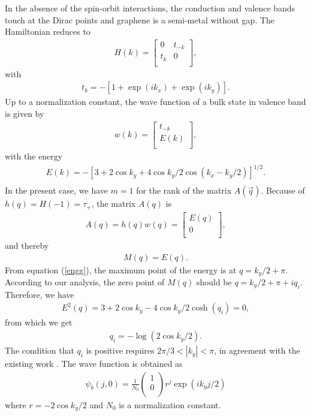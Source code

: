 \documentclass[aps,pra,amsmath,twocolumn,showpacs,bibnotes,10pt]{revtex4-1}
\begin{document}
In the absence of the spin-orbit interactions, the conduction and valence bands touch at the Dirac points and graphene is a semi-metal without gap. The Hamiltonian reduces to
\begin{eqnarray}
H(k) = \begin{bmatrix}
	0&t_{-k}\\
	t_k&0\\
\end{bmatrix}, \nonumber
\end{eqnarray}
with 
\begin{eqnarray}
t_k = -[1+\exp(ik_x)+\exp(ik_y)]. \nonumber
\end{eqnarray}
Up to a normalization constant, the wave function of a bulk state in valence band is given by
\begin{eqnarray}
w(k) = \begin{bmatrix}
	t_{-k}\\
	E(k)\\
\end{bmatrix}, \nonumber
\end{eqnarray}
with the energy 
\begin{eqnarray}
E(k) = -[3+2\cos k_y+4\cos k_y/2 \cos(k_x-k_y/2)]^{1/2}. \nonumber\\
\label{engg}
\end{eqnarray}
In the present case, we have $m = 1$ for the rank of the matrix $A(\vec q)$. Because of $h(q) = H(-1) = \tau_+$, the matrix $A(q)$ is
\begin{eqnarray}
A(q) = h(q) w(q) = \begin{bmatrix}
	E(q)\\
	0\\
\end{bmatrix}, \nonumber
\end{eqnarray}
and thereby 
\begin{eqnarray}
M(q) = E(q).\nonumber
\end{eqnarray}
From equation (\ref{engg}), the maximum point of the energy is at $q = k_y/2+\pi$. According to our analysis, the zero point of $M(q)$ should be $q = k_y/2 +\pi+ iq_i$. Therefore, we have
\begin{eqnarray}
E^2(q)=3+2\cos k_y-4\cos k_y/2 \cosh(q_i) = 0,
\end{eqnarray}
from which we get
\begin{eqnarray}
q_i = -\log(2\cos k_y/2).
\end{eqnarray}
The condition that $q_i$ is positive requires $2\pi/3 < |k_y| <\pi$, in agreement with the existing work \cite {Fujita,Mong,Akhmerov}. The wave function is obtained as
\begin{eqnarray}
\psi_b(j,0) = \frac{1}{N_0}\begin{pmatrix}
	1\\
	0\\
\end{pmatrix}r^j\exp(ik_yj/2)  \nonumber
\end{eqnarray}
where $r = -2\cos k_y/2$ and $N_0$ is a normalization constant.
\end{document}
